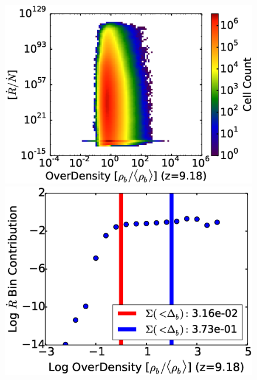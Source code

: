 \begin{figure}[!tp]
     \begin{minipage}[h]{0.33\linewidth}
        \centering
        \includegraphics[trim = 5mm 8mm 0mm 0mm, clip, width=1.0\textwidth]{1_1_HD4050OverDensityRecombIonFrac.eps}
     \end{minipage}
\hspace*{-2.00mm}
    \begin{minipage}[h]{0.33\linewidth}
       \centering
       \includegraphics[trim = 5mm 8mm 0mm 0mm, clip, width=1.0\textwidth]{1_2_HD4050_recomb_contrib_v_OD.eps}
     \end{minipage}
\hspace*{-4.00mm}
    \begin{minipage}[h]{0.33\linewidth}

\end{minipage}
\end{figure}
